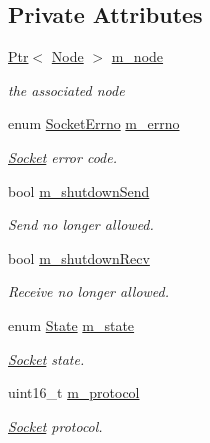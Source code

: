 \subsection*{Private Attributes}
\begin{DoxyCompactItemize}
\item 
\hyperlink{classns3_1_1Ptr}{Ptr}$<$ \hyperlink{classns3_1_1Node}{Node} $>$ \hyperlink{classns3_1_1PacketSocket_a1d16a7bb40df82877d5b6b257861d566}{m\+\_\+node}
\begin{DoxyCompactList}\small\item\em the associated node \end{DoxyCompactList}\item 
enum \hyperlink{classns3_1_1Socket_ada1328c5ae0c28cb2a982caf8f6d6cca}{Socket\+Errno} \hyperlink{classns3_1_1PacketSocket_ac1da4372f719a7fb20b8d7fa426f21cc}{m\+\_\+errno}
\begin{DoxyCompactList}\small\item\em \hyperlink{classns3_1_1Socket}{Socket} error code. \end{DoxyCompactList}\item 
bool \hyperlink{classns3_1_1PacketSocket_ad16347ae79f47e980085db3a2674dc40}{m\+\_\+shutdown\+Send}
\begin{DoxyCompactList}\small\item\em Send no longer allowed. \end{DoxyCompactList}\item 
bool \hyperlink{classns3_1_1PacketSocket_af766986fa3298b3156972c0559fb8fa5}{m\+\_\+shutdown\+Recv}
\begin{DoxyCompactList}\small\item\em Receive no longer allowed. \end{DoxyCompactList}\item 
enum \hyperlink{classns3_1_1PacketSocket_a376c65cdab494c41bd65f9aaeef543e5}{State} \hyperlink{classns3_1_1PacketSocket_adbf0f1f9b0a0bed7169ecdcb5a1ef66a}{m\+\_\+state}
\begin{DoxyCompactList}\small\item\em \hyperlink{classns3_1_1Socket}{Socket} state. \end{DoxyCompactList}\item 
uint16\+\_\+t \hyperlink{classns3_1_1PacketSocket_ab563605d15111f7caef9a0c9ca18167c}{m\+\_\+protocol}
\begin{DoxyCompactList}\small\item\em \hyperlink{classns3_1_1Socket}{Socket} protocol. \end{DoxyCompactList}\item 

\end{DoxyCompactItemize}
